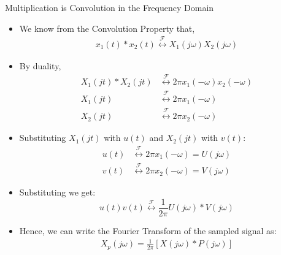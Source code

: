 \begin{frame}{Multiplication is Convolution in the Frequency Domain}
  \vspace{-0.2cm}
  \begin{itemize}
      [bullet]
    \item We know from the Convolution Property that,
      \begin{align*}
        x_1(t) * x_2(t) \stackrel{\mathcal{F}}{\longleftrightarrow} X_1(j\omega)X_2(j\omega)
      \end{align*}
    \item By duality,
      \begin{align*}
        X_1(jt) * X_2(jt) & \stackrel{\mathcal{F}}{\longleftrightarrow} 2\pi x_1(-\omega)x_2(-\omega) \\
        X_1(jt)           & \stackrel{\mathcal{F}}{\longleftrightarrow} 2\pi x_1(-\omega)             \\
        X_2(jt)           & \stackrel{\mathcal{F}}{\longleftrightarrow} 2\pi x_2(-\omega)
      \end{align*}
    \item Substituting $X_1(jt)$ with $u(t)$ and $X_2(jt)$ with $v(t)$:
      \begin{align*}
        u(t) & \stackrel{\mathcal{F}}{\longleftrightarrow} 2\pi x_1(-\omega)  = U(j\omega) \\
        v(t) & \stackrel{\mathcal{F}}{\longleftrightarrow} 2\pi x_2(-\omega)  = V(j\omega)
      \end{align*}
    \item Substituting we get:
      \begin{equation*}
        u(t)v(t) \stackrel{\mathcal{F}}{\longleftrightarrow} \frac{1}{2\pi} U(j\omega) * V(j\omega)
      \end{equation*}
    \item Hence, we can write the Fourier Transform of the sampled signal as:
      \begin{align*}
        X_p(j\omega) = \frac{1}{2\pi} \left[ X(j\omega) * P(j\omega) \right]
      \end{align*}
  \end{itemize}
\end{frame}

